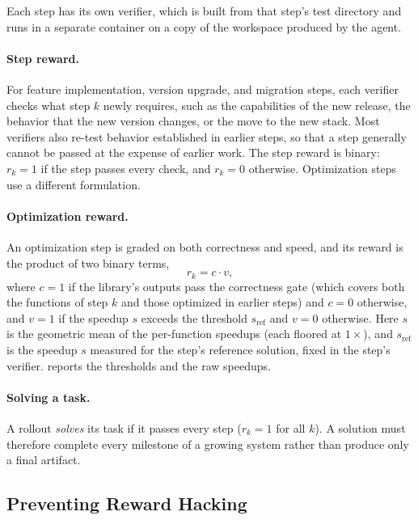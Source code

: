\documentclass{article}
\begin{document}
Each step has its own verifier, which is built from that step's test directory
and runs in a separate container on a copy of the workspace produced by the
agent.

\paragraph{Step reward.}
For feature implementation, version upgrade, and migration steps, each verifier
checks what step $k$ newly requires, such as the capabilities of the new
release, the behavior that the new version changes, or the move to the new
stack. Most verifiers also re-test behavior established in earlier steps, so
that a step generally cannot be passed at the expense of earlier work. The step
reward is binary: $r_k=1$ if the step passes every check, and $r_k=0$
otherwise. Optimization steps use a different formulation.

\paragraph{Optimization reward.}
An optimization step is graded on both correctness and speed, and its reward
is the product of two binary terms,
\begin{equation}
  \label{eq:opt-score}
  r_k = c \cdot v,
\end{equation}
where $c=1$ if the library's outputs pass the correctness gate (which covers
both the functions of step $k$ and those optimized in earlier steps) and $c=0$
otherwise, and $v=1$ if the speedup $s$ exceeds the threshold $s_{\mathrm{ref}}$ and $v=0$
otherwise. Here $s$ is the geometric mean of the per-function speedups (each
floored at $1\times$), and $s_{\mathrm{ref}}$ is the speedup $s$ measured for the
step's reference solution, fixed in the step's verifier. 
reports the thresholds and the raw speedups.

\paragraph{Solving a task.}
A rollout \emph{solves} its task if it passes every step ($r_k=1$ for all
$k$). A solution must therefore complete every milestone of a growing system
rather than produce only a final artifact.

\subsection{Preventing Reward Hacking}
\label{sec:reward-hacking}
\end{document}
